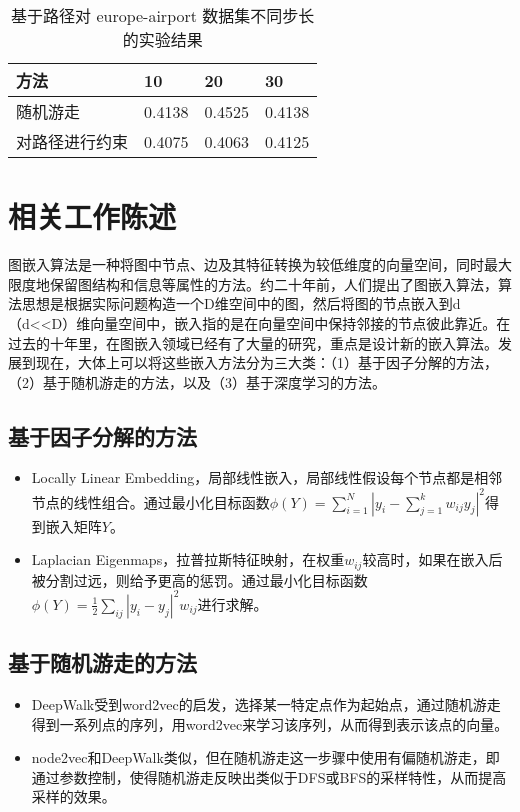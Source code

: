 \documentclass{ctexart}
\begin{document}
\begin{table}[!t]
\renewcommand{\arraystretch}{1.1}
\caption{基于路径对 europe-airport 数据集不同步长的实验结果}
\label{exp: europe-path}
\centering
\begin{tabular}{|l|l|l|l|}
    \hline
    方法 & 10 & 20 & 30 \\
    \hline
    随机游走 & 0.4138 & 0.4525 & 0.4138 \\
    \hline
    对路径进行约束 & 0.4075 & 0.4063 & 0.4125 \\
    \hline
\end{tabular}
\end{table}

\section{相关工作陈述}

图嵌入算法是一种将图中节点、边及其特征转换为较低维度的向量空间，同时最大限度地保留图结构和信息等属性的方法。约二十年前，人们提出了图嵌入算法，算法思想是根据实际问题构造一个D维空间中的图，然后将图的节点嵌入到d（d<<D）维向量空间中，嵌入指的是在向量空间中保持邻接的节点彼此靠近。在过去的十年里，在图嵌入领域已经有了大量的研究，重点是设计新的嵌入算法。发展到现在，大体上可以将这些嵌入方法分为三大类：（1）基于因子分解的方法，（2）基于随机游走的方法，以及（3）基于深度学习的方法\cite{goyal2018graph}。

\subsection{基于因子分解的方法}

\begin{itemize}
    \item Locally Linear Embedding，局部线性嵌入，局部线性假设每个节点都是相邻节点的线性组合。通过最小化目标函数$\phi(Y)=\sum_{i=1}^N|y_i-\sum_{j=1}^kw_{ij}y_j|^2$得到嵌入矩阵$Y$。
    \item Laplacian Eigenmaps，拉普拉斯特征映射，在权重$w_{ij}$较高时，如果在嵌入后被分割过远，则给予更高的惩罚。通过最小化目标函数$\phi(Y)=\frac{1}{2}\sum_{ij} |y_i-y_j|^2w_{ij}$进行求解。
\end{itemize}

\subsection{基于随机游走的方法}

\begin{itemize}
    \item DeepWalk受到word2vec的启发，选择某一特定点作为起始点，通过随机游走得到一系列点的序列，用word2vec来学习该序列，从而得到表示该点的向量。
    \item node2vec和DeepWalk类似，但在随机游走这一步骤中使用有偏随机游走，即通过参数控制，使得随机游走反映出类似于DFS或BFS的采样特性，从而提高采样的效果。
\end{itemize}
\end{document}

